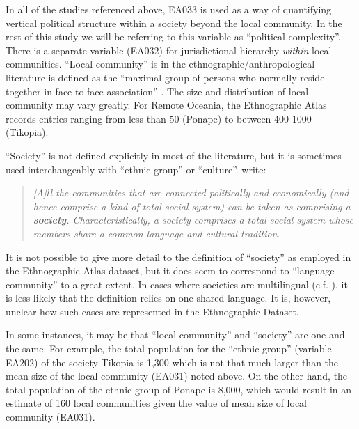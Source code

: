 \documentclass[a4paper,10pt]{article} %
\begin{document}
In all of the studies referenced above, EA033 is used as a way of quantifying vertical political structure within a society beyond the local community. In the rest of this study we will be referring to this variable as ``political complexity''. There is a separate variable (EA032) for jurisdictional hierarchy \emph{within} local communities. ``Local community'' is in the ethnographic/anthropological literature is defined as the ``maximal group of persons who normally reside together in face-to-face association'' \citep{yale1945outline}. The size and distribution of local community may vary greatly. For Remote Oceania, the Ethnographic Atlas records entries ranging from less than 50 (Ponape) to between 400-1000 (Tikopia).

``Society'' is not defined explicitly in most of the literature, but it is sometimes used interchangeably with ``ethnic group'' or ``culture''. \citet{roger1981cultural} write:

\begin{quotation}
\noindent\emph{[A]ll the communities that are connected politically and economically (and hence comprise a kind of total social system) can be taken as comprising a \textbf{society}. Characteristically, a society comprises a total social system whose members share a common language and cultural tradition}. 
\begin{flushright}
\citep[22]{roger1981cultural} 
\end{flushright}
 \end{quotation}


It is not possible to give more detail to the definition of ``society'' as employed in the Ethnographic Atlas dataset, but it does seem to correspond to ``language community'' to a great extent. In cases where societies are multilingual (c.f. \citet{evans2017did}), it is less likely that the definition relies on one shared language. It is, however, unclear how such cases are represented in the Ethnographic Dataset.

In some instances, it may be that ``local community'' and ``society'' are one and the same. For example, the total population for the ``ethnic group'' (variable EA202) of the society Tikopia is 1,300 which is not that much larger than the mean size of the local community (EA031) noted above. On the other hand, the total population of the ethnic group of Ponape is 8,000, which would result in an estimate of 160 local communities given the value of mean size of local community (EA031).
  
\end{document}

